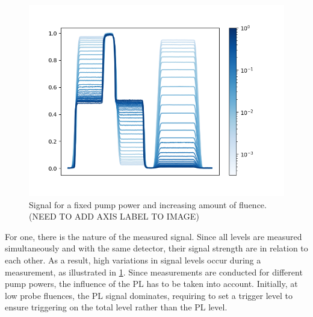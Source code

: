 \begin{figure}
    \vspace{-2.5\baselineskip}
    \centering
    \includegraphics[width=.98\textwidth]{images/trace_complete.png}
    \caption{Signal for a fixed pump power and increasing amount of fluence. (NEED TO ADD AXIS LABEL TO IMAGE)}
    \label{fig:complete}
\end{figure}
For one, there is the nature of the measured signal. Since all levels are measured simultaneously and with the same detector, their signal strength are in relation to each other. As a result, high variations in signal levels occur during a measurement, as illustrated in \cref{fig:complete}. Since measurements are conducted for different pump powers, the influence of the PL has to be taken into account. Initially, at low probe fluences, the PL signal dominates, requiring to set a trigger level to ensure triggering on the total level rather than the PL level. 

